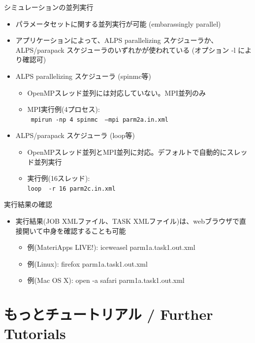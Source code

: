 \begin{frame}[t,fragile]{シミュレーションの並列実行}
  \begin{itemize}
    \item パラメータセットに関する並列実行が可能 (embarassingly parallel)
    \item アプリケーションによって、ALPS parallelizing スケジューラか、ALPS/parapack スケジューラのいずれかが使われている (オプション -l により確認可)
    \item ALPS parallelizing スケジューラ (spinmc等)
      \begin{itemize}
        \item OpenMPスレッド並列には対応していない。MPI並列のみ
        \item MPI実行例(4プロセス): \\ {\tt {\color{red} mpirun -np 4} spinmc {\color{red} --mpi} parm2a.in.xml}
      \end{itemize}
    \item ALPS/parapack スケジューラ (loop等)
      \begin{itemize}
        \item OpenMPスレッド並列とMPI並列に対応。デフォルトで自動的にスレッド並列実行
        \item 実行例(16スレッド): \\ {\tt loop {\color{red} -r 16} parm2c.in.xml}
      \end{itemize}
  \end{itemize}
\end{frame}

\begin{frame}[t,fragile]{実行結果の確認}
  \begin{itemize}
    \item 実行結果(JOB XMLファイル、TASK XMLファイル)は、webブラウザで直接開いて中身を確認することも可能
      \begin{itemize}
      \item 例(MateriApps LIVE!): iceweasel parm1a.task1.out.xml
      \item 例(Linux): firefox parm1a.task1.out.xml
      \item 例(Mac OS X): open -a safari parm1a.task1.out.xml
      \end{itemize}
  \end{itemize}
\end{frame}

\section{もっとチュートリアル / Further Tutorials}
